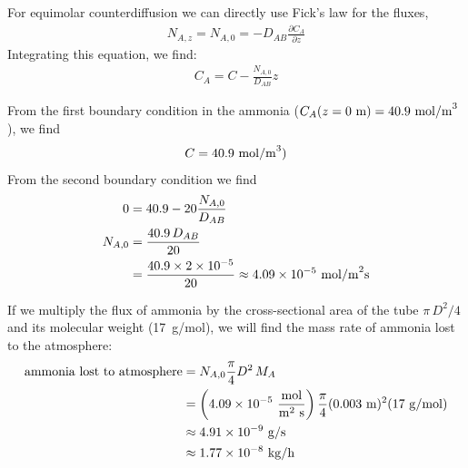 \documentclass[calculator,datasheet,handbook]{exam}
\begin{document}
{\begin{question}
\begin{enumerate}[a)]
{        For equimolar counterdiffusion we can directly use Fick's law
        for the fluxes,
        \begin{align*}
          N_{A,z}=N_{A,0} = -D_{AB} \frac{\partial C_A}{\partial z}
        \end{align*}
        Integrating this equation, we find:
        \begin{align*}
          C_A = C - \frac{N_{A,0}}{D_{AB}} z
        \end{align*}
        
        From the first boundary condition in the ammonia
        ($C_A(z=0~\text{m})=40.9~{\rm mol/m}^3$), we find
        \begin{align*}
          C = 40.9~{\rm mol/m}^3)
        \end{align*}
        From the second boundary condition we find
        \begin{align*}
          0 &= 40.9 - 20 \frac{N_{A,0}}{D_{AB}} \\
          N_{A,0} &= \frac{40.9\,D_{AB}}{20} \\
            &= \frac{40.9\times 2\times10^{-5}}{20} \approx 4.09\times10^{-5}~{\rm mol/m}^2{\rm s}
        \end{align*}
        
        If we multiply the flux of ammonia by the cross-sectional area
        of the tube $\pi\,D^2/4$ and its molecular weight (17~g/mol), we
        will find the mass rate of ammonia lost to the atmosphere:
        \begin{align*}
          \mbox{ammonia lost to atmosphere} &= N_{A,0} \frac{\pi}{4}D^2\,M_{A} 
          \\
                                            &= \left(4.09\times10^{-5}~\frac{\rm mol}{{\rm m}^2~{\rm s}}\right)
                                              \frac{\pi}{4}(0.003~{\rm m})^2(17~{\rm g/mol})
          \\
                                            &\approx 4.91\times10^{-9}~{\rm g/s}
          \\
                                            &\approx 1.77\times10^{-8}~{\rm kg/h}
        \end{align*}
        
}
\end{enumerate}
\end{question}}
\end{document}
